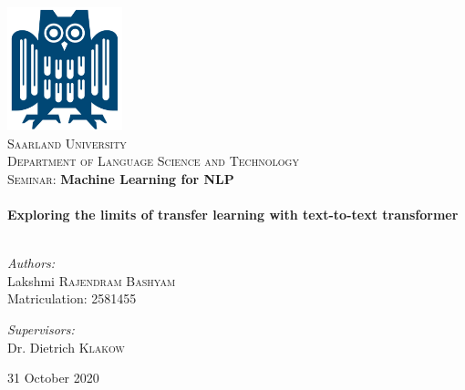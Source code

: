 \begin{titlepage}
\begin{center}

\includegraphics[width=0.25\textwidth]{images/uni-eule}~\\[1cm]

\textsc{\LARGE Saarland  University}\\[0.4cm]
\textsc{\Large Department of Language Science and Technology}\\[1.5cm]

\textsc{\Large Seminar:} \textbf{\Large Machine Learning for NLP}\\[0.5cm]

\HRule \\[1.0cm]

{ \huge \bfseries Exploring the limits of transfer learning with text-to-text transformer}\\[0.4cm]

\HRule \\[1.5cm]

\begin{minipage}{0.4\textwidth}
\begin{flushleft} \large
\emph{Authors:}\\
Lakshmi \textsc{Rajendram Bashyam}\\
Matriculation: 2581455
\end{flushleft}
\end{minipage}
\begin{minipage}{0.4\textwidth}
\begin{flushright} \large
\emph{Supervisors:} \\
Dr. Dietrich  \textsc{Klakow}\\
\end{flushright}
\end{minipage}

\vfill

{\large 31 October 2020}

\end{center}
\end{titlepage}
